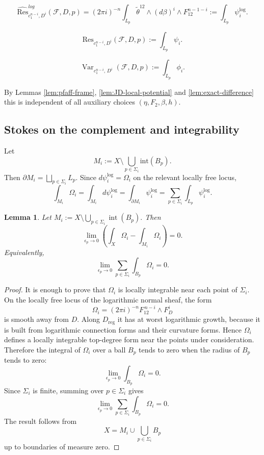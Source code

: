 \documentclass[12pt,reqno,a4paper]{amsart}
\numberwithin{equation}{section}
\theoremstyle{plain}
\newtheorem{lemma}[lemma]{Lemma}
\theoremstyle{definition}
\DeclareMathOperator{\Var}{Var}
\newcommand{\cF}{\mathcal{F}}
\begin{document}
\begin{equation} \label{eq:local-log-residue}
    \widehat{\mbox{Res}}^{log}_{c_1^{n-i}, D^i}(\cF,D,p) = (2 \pi {   i})^{-n} \int_{L_p} \tilde{\theta}^{12} \wedge (d \beta)^i \wedge F_{12}^{n-1-i} := \int_{L_p} \psi_i^{\log}.
\end{equation}



\begin{equation} 
    \mbox{Res}_{c_1^{n-i}, D^i}(\cF,D,p) :=  \int_{L_p} \psi_i  .
\end{equation}



\begin{equation} 
    \Var_{c_1^{n-i},\,D^i}(\cF,D,p)
:=\int_{L_p}\phi_i.
\end{equation}

By Lemmas \ref{lem:pfaff-frame}, \ref{lem:JD-local-potential} and \ref{lem:exact-difference} this is independent of all auxiliary choices $(\eta, F_2, \beta, h).$




 

\subsection{Stokes on the complement and integrability}

Let $$M_i:=X \setminus \bigcup_{p \in \Sigma_i} \mbox{int}(B_p).$$
Then \(\partial M_i = \bigsqcup_{p\in\Sigma_i} L_p\). Since \(d \psi_i^{\log} = \Omega_i\) on the relevant locally free locus,
\begin{equation}
    \int_{M_i} \Omega_i = \int_{M_i} d \psi_i^{\log} = \int_{\partial M_i} \psi_i^{\log} = \sum_{p\in\Sigma_i} \int_{L_p} \psi_i^{\log}.
\end{equation}


 

\begin{lemma}\label{lem:integrability}
Let
$
M_i:=X\setminus\bigcup_{p\in\Sigma_i}\operatorname{int}(B_p).$
Then
\[
\lim_{\epsilon_p\to 0}
\left(
\int_X\Omega_i-\int_{M_i}\Omega_i
\right)
=0.
\]
Equivalently,
\[
\lim_{\epsilon_p\to 0}
\sum_{p\in\Sigma_i}\int_{B_p}\Omega_i=0.
\]
\end{lemma}

\begin{proof}
It is enough to prove that \(\Omega_i\) is locally integrable near each point of
\(\Sigma_i\). On the locally free locus of the logarithmic normal sheaf, the form
\[
\Omega_i=(2\pi i)^{-n}F_{12}^{\,n-i}\wedge F_D^i
\]
is smooth away from \(D\). Along \(D_{\mathrm{reg}}\) it has at worst logarithmic
growth, because it is built from logarithmic connection forms and their curvature
forms. Hence \(\Omega_i\) defines a locally integrable top-degree form near the
points under consideration.
Therefore the integral of \(\Omega_i\) over a ball \(B_p\) tends to zero when the
radius of \(B_p\) tends to zero:
\[
\lim_{\epsilon_p\to0}\int_{B_p}\Omega_i=0.
\]
Since \(\Sigma_i\) is finite, summing over \(p\in\Sigma_i\) gives
\[
\lim_{\epsilon_p\to0}
\sum_{p\in\Sigma_i}\int_{B_p}\Omega_i=0.
\]
The result follows from
\[
X=M_i\cup\bigcup_{p\in\Sigma_i}B_p
\]
up to boundaries of measure zero.
\end{proof}
\end{document}
